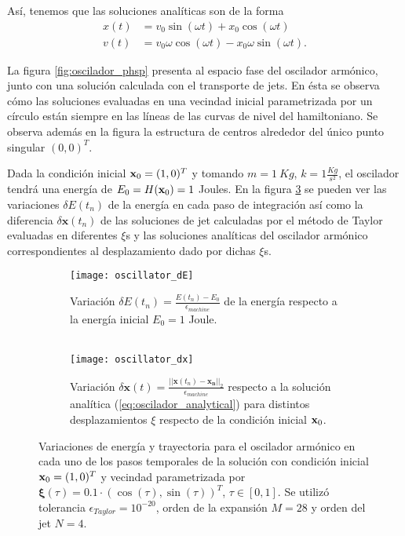 Así, tenemos que las soluciones analíticas son de la forma 
\begin{align}
 x(t) &= v_{0}\sin{(\omega t)} + x_{0}\cos{(\omega t)} \nonumber \\ 
 v(t) &= v_{0}\omega\cos{(\omega t)} - x_{0}\omega\sin{(\omega t)}. 
 \label{eq:oscilador_analytical}
\end{align}

La figura \ref{fig:oscilador_phsp} presenta al espacio fase del oscilador armónico, junto con una solución calculada con el transporte de jets. En ésta se observa cómo las soluciones evaluadas en una vecindad inicial parametrizada por un círculo están siempre en las líneas de las curvas de nivel del hamiltoniano. Se observa además en la figura la estructura de centros alrededor del único punto singular $(0,0)^T$.

Dada la condición inicial $\mathbf{x}_0 = (1,0)^T$ y tomando $m = 1 \ Kg$, $k = 1 \frac{Kg}{s^2}$, el oscilador tendrá una energía de $E_0 = H(\mathbf{x}_0) = 1$ Joules. En la figura \ref{fig:oscillator_deltas} se pueden ver las variaciones $\delta E(t_n)$ de la energía en cada paso de integración así como la diferencia $\delta \mathbf{x}(t_n)$ de las soluciones de jet calculadas por el método de Taylor evaluadas en diferentes $\xi$s y las soluciones analíticas del oscilador armónico correspondientes al desplazamiento dado por dichas $\xi$s.

 \begin{figure}[h!]
\centering
\begin{subfigure}{0.49\textwidth}
	\centering
	\texttt{[image: oscillator\_dE]}
	\caption{Variación $\delta E(t_n) = \frac{E(t_n)-E_0}{\epsilon_{machine}}$ de la energía respecto a la energía inicial $E_0 = 1$ Joule.\\ \\ }
	\label{fig:oscillator_dE}
\end{subfigure}
%
\begin{subfigure}{0.49\textwidth}
	\centering
	\texttt{[image: oscillator\_dx]}
	\caption{Variación $\delta \mathbf{x}(t) =  \frac{||\mathbf{x}(t_n) - \mathbf{x_n}||_2}{\epsilon_{machine}}$ respecto a la solución analítica (\ref{eq:oscilador_analytical}) para distintos desplazamientos $\xi$ respecto de la condición inicial $\mathbf{x}_0$.}
	\label{fig:oscillator_dx}
\end{subfigure}
\caption{Variaciones de energía y trayectoria para el oscilador armónico en cada uno de los pasos temporales de la solución con condición inicial $\mathbf{x}_0 = (1,0)^T$ y vecindad parametrizada por  $\mathbf{\xi}(\tau) = 0.1\cdot \left( \cos(\tau), \sin(\tau) \right)^T$, $\tau \in [0,1]$. Se utilizó tolerancia $\epsilon_{Taylor} = 10^{-20}$, orden de la expansión $M = 28$ y orden del jet $N=4$.}
\label{fig:oscillator_deltas}
\end{figure}

